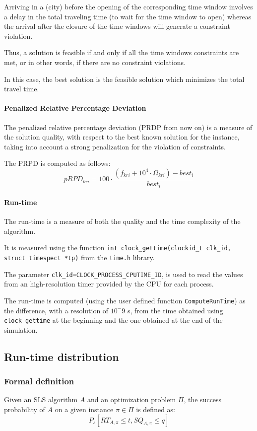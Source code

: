 Arriving in a (city) before the opening of the corresponding time window involves a delay in the total traveling time (to wait for the time window to open) whereas the arrival after the closure of the time windows will generate a constraint violation.

Thus, a solution is feasible if and only if all the time windows constraints are met, or in other words, if there are no constraint violations.

In this case, the best solution is the feasible solution which minimizes the total travel time.

\paragraph{Penalized Relative Percentage Deviation}
The penalized relative percentage deviation (PRDP from now on) is a measure of the solution quality, with respect to the best known solution for the instance, taking into account a strong penalization for the violation of constraints.

The PRPD is computed as follows:
\begin{equation}
pRPD_{kri} = 100 \cdot \frac{(f_{kri} + 10^4\cdot\Omega_{kri})-best_i}{best_i}
\end{equation}

\paragraph{Run-time}
The run-time is a measure of both the quality and the time complexity of the algorithm.

It is measured using the function \verb|int clock_gettime(clockid_t clk_id, struct timespect *tp)| from the \verb|time.h| library.

The parameter \verb|clk_id=CLOCK_PROCESS_CPUTIME_ID|, is used to read the values from an high-resolution timer provided by the CPU for each process.

The run-time is computed (using the user defined function \verb|ComputeRunTime|) as the difference, with a resolution of $10^-9$ s, from the time obtained using \verb|clock_gettime| at the beginning and the one obtained at the end of the simulation.

\subsection{Run-time distribution}
\subsubsection{Formal definition}
Given an SLS algorithm $A$ and an optimization problem $\Pi$, the success probability of $A$ on a given instance $\pi \in \Pi$ is defined as: 
\begin{equation}
  P_s[RT_{A,\pi} \le t,SQ_{A,\pi} \le q]
\end{equation}

